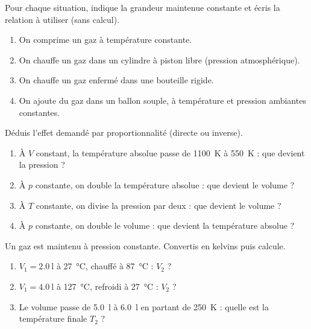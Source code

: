\documentclass[11pt,a4paper]{article}
\begin{document}
\begin{exo}
Pour chaque situation, indique la grandeur maintenue constante et écris la relation à utiliser (sans
calcul).
\begin{enumerate}[label=\alph*)]
  \item On comprime un gaz à température constante.
  \item On chauffe un gaz dans un cylindre à piston libre (pression atmosphérique).
  \item On chauffe un gaz enfermé dans une bouteille rigide.
  \item On ajoute du gaz dans un ballon souple, à température et pression ambiantes constantes.
\end{enumerate}
\end{exo}

\begin{exo}
Déduis l'effet demandé par proportionnalité (directe ou inverse).
\begin{enumerate}[label=\alph*)]
  \item À $V$ constant, la température absolue passe de \qty{1100}{\kelvin} à \qty{550}{\kelvin} : que
        devient la pression ?
  \item À $p$ constante, on double la température absolue : que devient le volume ?
  \item À $T$ constante, on divise la pression par deux : que devient le volume ?
  \item À $p$ constante, on double le volume : que devient la température absolue ?
\end{enumerate}
\end{exo}

\begin{exo}
Un gaz est maintenu à pression constante. Convertis en kelvins puis calcule.
\begin{enumerate}[label=\alph*)]
  \item $V_1=\qty{2.0}{\litre}$ à \qty{27}{\degreeCelsius}, chauffé à \qty{87}{\degreeCelsius} : $V_2$ ?
  \item $V_1=\qty{4.0}{\litre}$ à \qty{127}{\degreeCelsius}, refroidi à \qty{27}{\degreeCelsius} : $V_2$ ?
  \item Le volume passe de \qty{5.0}{\litre} à \qty{6.0}{\litre} en partant de \qty{250}{\kelvin} :
        quelle est la température finale $T_2$ ?
\end{enumerate}
\end{exo}
\end{document}

